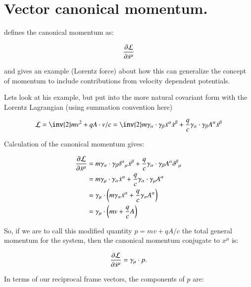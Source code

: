 \chapter{Vector canonical momentum.}\label{chap:PJCanMomentum}
\date{Sept. 1, 2008.  canonicalMomentum.tex}

\cite{goldstein1951cm} defines the canonical momentum as:

\begin{equation*}
\frac{\partial {\mathcal{L}}}{\partial {\dot{x}^{\mu}}}
\end{equation*}

and gives an example (Lorentz force) about how this can generalize the
concept of momentum to include contributions from velocity dependent 
potentials.

Lets look at his example, but put into the more natural covariant form
with the Lorentz Lagrangian (using summation convention here)

\begin{equation*}
\LL = \inv{2} m v^2 + q A \cdot v /c = 
\inv{2} m \gamma_{\alpha} \cdot \gamma_{\beta} \xdot^{\alpha} \xdot^{\beta}
+ \frac{q}{c} \gamma_{\alpha} \cdot \gamma_{\beta} A^{\alpha} \xdot^{\beta}
\end{equation*}

Calculation of the canonical momentum gives:

\begin{align*}
\frac{\partial {\mathcal{L}}}{\partial {\dot{x}^{\mu}}} 
&=
m \gamma_{\alpha} \cdot \gamma_{\beta} {\delta^{\alpha}}_{\mu} \dot{x}^{\beta}
+ \frac{q}{c} \gamma_{\alpha} \cdot \gamma_{\beta} A^{\alpha} {\delta^{\beta}}_{\mu} \\
&=
m \gamma_{\mu} \cdot \gamma_{\alpha} \dot{x}^{\alpha}
+ \frac{q}{c} \gamma_{\alpha} \cdot \gamma_{\mu} A^{\alpha} \\
&=
\gamma_{\mu} \cdot \left( 
m \gamma_{\alpha} \dot{x}^{\alpha}
+ \frac{q}{c} \gamma_{\alpha} A^{\alpha}
\right) \\
&= \gamma_{\mu} \cdot \left( m v + \frac{q}{c} A \right) \\
\end{align*}

So, if we are to call this modified quantity $p = m v + q A / c$ the total general momentum for the system, then the canonical momentum conjugate to $x^{\mu}$ is:

\begin{equation*}
\frac{\partial {\mathcal{L}}}{\partial {\dot{x}^{\mu}}} = \gamma_{\mu} \cdot p.
\end{equation*}

In terms of our reciprocal frame vectors, the components of $p$ are:

